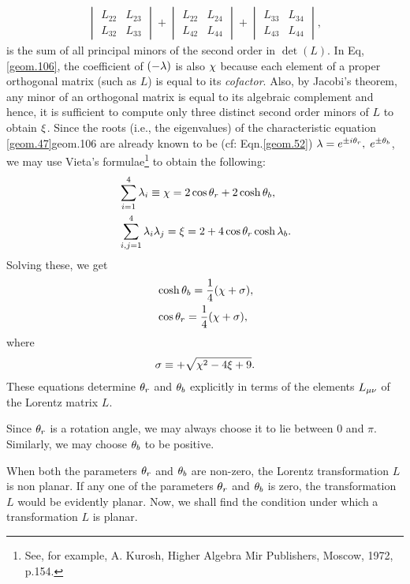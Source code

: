 {\begin{align}
\begin{vmatrix}
L_{22}&L_{23}\\L_{32}&L_{33}\end{vmatrix}
+\begin{vmatrix}
L_{22}&L_{24}\\L_{42}&L_{44}\end{vmatrix}
+\begin{vmatrix} L_{33}&L_{34}\\L_{43}&L_{44}
\end{vmatrix},
\end{align}
is the sum of all principal minors of the second order 
in $\det(L)$. In Eq,\eqref{geom.106}, the coefficient 
of $(-{\lambda})$ is also ${\chi}$  because each element of a 
proper orthogonal matrix (such as $L$) is equal to its 
\textsl{cofactor}. Also, by Jacobi's theorem, any 
minor 
of an orthogonal matrix is equal to its algebraic 
complement and hence, it is sufficient to compute only 
three distinct second order minors of $L$ to obtain 
${\xi}$. Since the roots (i.e., the eigenvalues) of the 
characteristic equation \eqref{geom.47}{geom.106} are 
already known to be (cf: Eqn.\eqref{geom.52}) 
${\lambda}=e^{\pm i{\theta}_r}, \; e^{\pm {\theta}_b}$, we may use  
Vieta's formulae\footnote{See, for example, A. Kurosh, 
{Higher Algebra} Mir Publishers, Moscow, 1972, p.154.} 
to obtain the following:
\begin{align}\label{geom.109}
& \sum_{i=1}^{4}{\lambda}_i\equiv 
{\chi}=2\cos{\theta}_r+2\cosh{\theta}_b,
\\\label{geom.110}
& \sum_{i,j=1}^{4}{\lambda}_i {\lambda}_j 
={\xi}=2+ 4\cos{\theta}_r\cosh{\lambda}_b.
\end{align}
Solving these, we get
\begin{align}\label{geom.111}
&\cosh{\theta}_b = \frac{1}{4}({\chi}+{\sigma}), \\ 
\label{geom.112}
&\cos{\theta}_r = \frac{1}{4}({\chi}+{\sigma}),
\end{align}
where 
\begin{align}\label{geom.113}
{\sigma} \equiv +\sqrt{{\chi}^2-4{\xi}+9}.
\end{align}
These equations determine ${\theta}_r$ and ${\theta}_b$  
explicitly in terms of the elements $L_{{\mu}{\nu}}$ of 
the Lorentz matrix $L$.

Since ${\theta}_r$ is a rotation angle, we may always 
choose it to lie between $0$ and $\pi$. Similarly, we 
may choose ${\theta}_b$ to be positive.

When both the parameters ${\theta}_r$ and ${\theta}_b$ are 
non-zero, the Lorentz transformation $L$ is non 
planar. 
If any one of the parameters ${\theta}_r$ and ${\theta}_b$ is 
zero, the transformation $L$ would be evidently 
planar. 
Now, we shall find the condition  under which  a 
transformation $L$ is planar.

}
